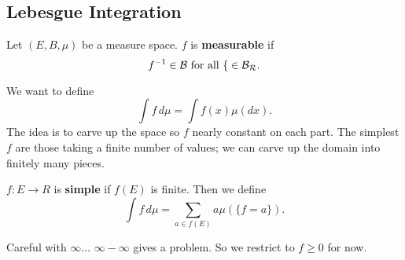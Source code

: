 
\subsection{Lebesgue Integration}
\begin{df}
Let $(E,B,\mu)$ be a measure space. $f$ is \textbf{measurable} if 
\[
f^{-1}\in \cal B \text{ for all }f\in \cal B_R.
\]
\end{df}
We want to define
\[
\int f\,d\mu=\int f(x)\mu(dx).
\]
The idea is to carve up the space so $f$ nearly constant on each part. The simplest $f$ are those taking a finite number of values; we can carve up the domain into finitely many pieces.
\begin{df}
$f:E\to R$ is \textbf{simple} if $f(E)$ is finite. Then we define
\[
\int f\,d\mu=\sum_{a\in f(E)}a\mu(\{f=a\}).
\]
\end{df}
Careful with $\infty$... $\infty-\infty$ gives a problem. So we restrict to $f\geq 0$ for now.


